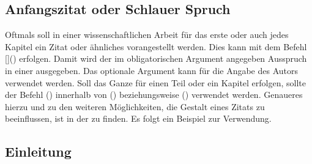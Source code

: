 \documentclass[%
  english,ngerman,%
  cdgeometry=no,DIV=12,%
  automark,%
  listof=toc,%
]{tudscrartcl}
\begin{document}
\section{Anfangszitat oder Schlauer Spruch}
\renewcommand*\dictumwidth{.4\textwidth}%
%
\bigskip\noindent
Oftmals soll in einer wissenschaftlichen Arbeit für das erste oder auch jedes 
Kapitel ein Zitat oder ähnliches vorangestellt werden. Dies kann mit dem Befehl
[]()
erfolgen. Damit wird der im obligatorischen Argument angegeben Ausspruch in 
einer  ausgegeben. Das optionale Argument kann für die Angabe 
des Autors verwendet werden. Soll das Ganze für einen Teil oder ein Kapitel 
erfolgen, sollte der Befehl () innerhalb 
von () beziehungsweise 
() verwendet werden. Genaueres 
hierzu und zu den weiteren Möglichkeiten, die Gestalt eines Zitats zu 
beeinflussen, ist in der  zu finden. Es 
folgt ein Beispiel zur Verwendung.
%
\begin{Hint}
\chapter{Einleitung}

\end{Hint}
\end{document}
